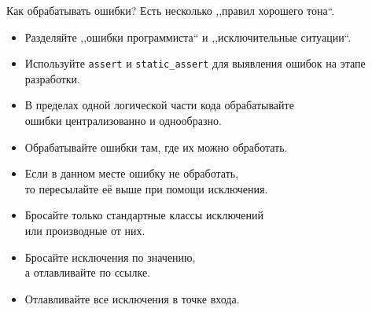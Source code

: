 \documentclass[aspectration=1610,t]{beamer}
\begin{document}
\begin{frame}[fragile]{Как обрабатывать ошибки?}
    Есть несколько ,,правил хорошего тона``.
    \begin{itemize}
        \item Разделяйте ,,ошибки программиста``
            и ,,исключительные ситуации``.
            
        \item Используйте \texttt{assert} и \texttt{static\_assert} 
        для выявления ошибок на этапе разработки.
        
        \item В пределах одной логической части кода 
        обрабатывайте\\ ошибки централизованно и однообразно.

        \item Обрабатывайте ошибки там, где их можно обработать.
        
        \item Если в данном месте ошибку не обработать, \\то
             пересылайте её выше при помощи исключения.
 
        \item Бросайте только стандартные классы исключений\\ или производные от них.

        \item Бросайте исключения по значению, \\а отлавливайте по ссылке.

        \item Отлавливайте все исключения в точке входа.
       
    \end{itemize}
    



\end{frame}
\end{document}
